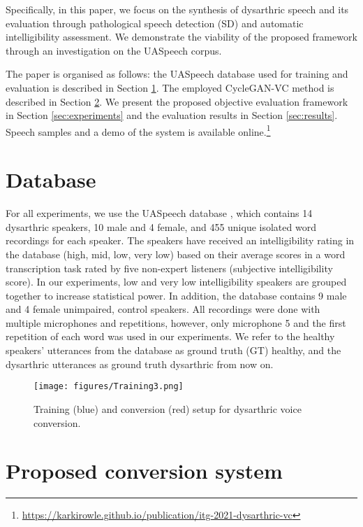 \documentclass[a4paper]{article}
\begin{document}
Specifically, in this paper, we focus on the synthesis of dysarthric speech and its evaluation through pathological speech detection (SD) and automatic intelligibility assessment. We demonstrate the viability of the proposed framework through an investigation on the UASpeech corpus. 

The paper is organised as follows: the UASpeech database used for training and evaluation is described in Section \ref{sec:database}. The employed CycleGAN-VC method is described in Section \ref{sec:methods}.   We present the proposed objective evaluation framework  in Section \ref{sec:experiments} and the evaluation results in Section \ref{sec:results}. Speech samples and a demo of the system is available online.\footnote{\url{https://karkirowle.github.io/publication/itg-2021-dysarthric-vc}}


\section{Database}
\label{sec:database}

For all experiments, we use the UASpeech database \cite{kim2008dysarthric}, which contains 14 dysarthric speakers, 10 male and 4 female, and 455 unique isolated word recordings for each speaker. The speakers have received an intelligibility rating in the database (high, mid, low, very low) based on their average scores in a word transcription task rated by five non-expert listeners (subjective intelligibility score). In our experiments, low and very low intelligibility speakers are grouped together to increase statistical power. In addition, the database contains 9 male and 4 female unimpaired, control speakers. All recordings were done with multiple microphones and repetitions, however, only microphone 5 and the first repetition of each word was used in our experiments. We refer to the healthy speakers' utterances from the database as ground truth (GT) healthy, and the dysarthric utterances as ground truth dysarthric from now on. 


\begin{figure*}[!htb]
    \centering
    \texttt{[image: figures/Training3.png]}
    \caption{Training (blue) and conversion (red) setup for dysarthric voice conversion.}
    \label{fig:training}
\end{figure*}


\section{Proposed conversion system}
\label{sec:methods}
\end{document}
